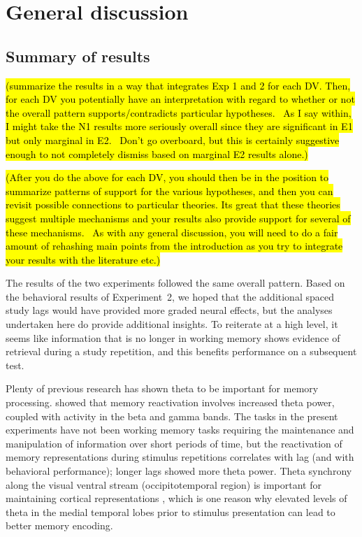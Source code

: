 
\chapter{General discussion}

\section{Summary of results}

\hl{(summarize the results in a way that integrates Exp 1 and 2 for each DV.  Then, for each DV you potentially have an interpretation with regard to whether or not the overall pattern supports/contradicts particular hypotheses.  As I say within, I might take the N1 results more seriously overall since they are significant in E1 but only marginal in E2.  Don’t go overboard, but this is certainly suggestive enough to not completely dismiss based on marginal E2 results alone.)}

\hl{(After you do the above for each DV, you should then be in the position to summarize patterns of support for the various hypotheses, and then you can revisit possible connections to particular theories. Its great that these theories suggest multiple mechanisms and your results also provide support for several of these mechanisms.  As with any general discussion, you will need to do a fair amount of rehashing main points from the introduction as you try to integrate your results with the literature etc.)}

\cbstart

The results of the two experiments followed the same overall pattern.  Based on the behavioral results of Experiment~2, we hoped that the additional spaced study lags would have provided more graded neural effects, but the analyses undertaken here do provide additional insights.  To reiterate at a high level, it seems like information that is no longer in working memory shows evidence of retrieval during a study repetition, and this benefits performance on a subsequent test.

Plenty of previous research has shown theta to be important for memory processing.
 showed that memory reactivation involves increased theta power, coupled with activity in the beta and gamma bands.
The tasks in the present experiments have not been working memory tasks requiring the maintenance and manipulation of information over short periods of time, but the reactivation of memory representations during stimulus repetitions correlates with lag (and with behavioral performance); longer lags showed more theta power.
Theta synchrony along the visual ventral stream (occipitotemporal region) is important for maintaining cortical representations \cite{DuzeEtal2010}, which is one reason why elevated levels of theta in the medial temporal lobes prior to stimulus presentation can lead to better memory encoding.


